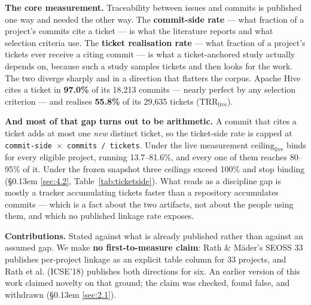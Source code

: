 \documentclass[11pt,a4paper]{article}
\begin{document}
\textbf{The core measurement.} Traceability between issues and commits is published one way and needed the other way. The \textbf{commit-side rate} --- what fraction of a project's commits cite a ticket --- is what the literature reports and what selection criteria use. The \textbf{ticket realisation rate} --- what fraction of a project's tickets ever receive a citing commit --- is what a ticket-anchored study actually depends on, because such a study samples tickets and then looks for the work. The two diverge sharply and in a direction that flatters the corpus. Apache Hive cites a ticket in \textbf{97.0\%} of its 18,213 commits --- nearly perfect by any selection criterion --- and realises \textbf{55.8\%} of its 29,635 tickets ($\mathrm{TRR}_\mathrm{live}$).

\textbf{And most of that gap turns out to be arithmetic.} A commit that cites a ticket adds at most one \emph{new} distinct ticket, so the ticket-side rate is capped at \texttt{commit-\allowbreak{}side $\times$ commits /\allowbreak{} tickets}. Under the live measurement $\mathrm{ceiling}_\mathrm{live}$ binds for every eligible project, running 13.7--81.6\%, and every one of them reaches 80--95\% of it. Under the frozen snapshot three ceilings exceed 100\% and stop binding (\S\kern0.13em \ref{sec:4.2}, Table~\ref{tab:ticketside}). What reads as a discipline gap is mostly a tracker accumulating tickets faster than a repository accumulates commits --- which is a fact about the two artifacts, not about the people using them, and which no published linkage rate exposes.

\textbf{Contributions.} Stated against what is already published rather than against an assumed gap. We make \textbf{no first-to-measure claim}: Rath \& M\"ader's SEOSS 33 \cite{rath2019seoss} publishes per-project linkage as an explicit table column for 33 projects, and Rath et al. (ICSE'18) \cite{rath2018traceability} publishes both directions for six. An earlier version of this work claimed novelty on that ground; the claim was checked, found false, and withdrawn (\S\kern0.13em \ref{sec:2.1}).
\end{document}
